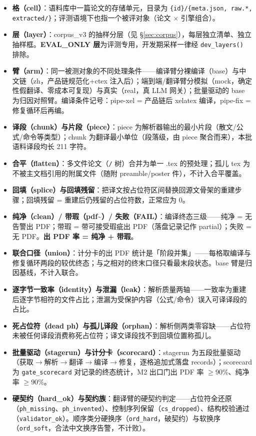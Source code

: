 \begin{itemize}
  \item \textbf{格（cell）}：语料库中一篇论文的存储单元，目录为 \texttt{\{id\}/\{meta.json, raw.*, extracted/\}}；评测语境下也指一个被评对象（论文 $\times$ 引擎组合）。
  \item \textbf{层（layer）}：corpus\_v3 的抽样分层（见 \S\ref{sec:corpus}），每层独立清单、独立抽样框。\textbf{EVAL\_ONLY 层}为评测专用，开发期采样一律经 \texttt{dev\_layers()} 排除。
  \item \textbf{臂（arm）}：同一被测对象的不同处理条件——编译臂分裸编译（base）与中文链（zh，产品链规范化+ctex 注入后）；端到端/翻译臂分模拟（mock，确定性假翻译、零成本可复现）与真实（real，真 LLM 网关）；批量驱动的 base 为归因对照臂。编译条件记号：pipe-xel = 产品链后 xelatex 编译，pipe-fix = 修复循环后再编。
  \item \textbf{译段（chunk）与片段（piece）}：piece 为解析器输出的最小片段（散文/公式/命令等类型）；chunk 为翻译最小单位（段落级，由 piece 聚合而来），本批语料译段均长 211 字符。
  \item \textbf{合平（flatten）}：多文件论文（\verb|/| 树）合并为单一 .tex 的预处理；孤儿 tex 为不被主文档引用的附属文件（随附 preamble/poster 件），不计入合平覆盖。
  \item \textbf{回填（splice）与回填残留}：把译文按占位符区间替换回源文骨架的重建步骤；回填残留 = 重建后仍残留的占位符数，正常应为 0。
  \item \textbf{纯净（clean）/ 带瑕（pdf\~{}）/ 失败（FAIL）}：编译终态三级——纯净 = 无告警出 PDF；带瑕 = 带可接受瑕疵出 PDF（落盘记录记作 partial）；失败 = 无 PDF。\textbf{出 PDF 率 = 纯净 + 带瑕}。
  \item \textbf{联合口径（union）}：计分卡的出 PDF 统计是「阶段并集」——每格取编译与修复循环两段的较优终态；与之相对的终末口径只看最末段状态。base 臂是归因基线，不计入联合。
  \item \textbf{逐字节一致率（identity）与泄漏（leak）}：解析质量两轴——一致率为重建后逐字节相符的文件占比；泄漏为受保护内容（公式/命令）误入可译译段的占比。
  \item \textbf{死占位符（dead ph）与孤儿译段（orphan）}：解析侧两类零容缺——占位符未被任何译段消费称死占位符；译文译段找不到回填位置称孤儿。
  \item \textbf{批量驱动（stagerun）与计分卡（scorecard）}：stagerun 为五段批量驱动（获取$\to$解析$\to$翻译$\to$编译$\to$修复，逐格追加式落盘 records）；scorecard 为 \texttt{gate\_scorecard} 对记录的终态统计，M2 出口门出 PDF 率 $\geq 90\%$、纯净率 $\geq 90\%$。
  \item \textbf{硬契约（hard\_ok）与契约族}：翻译臂的硬契约判定——占位符全还原（\texttt{ph\_missing}、\texttt{ph\_invented}）、控制序列保留（\texttt{cs\_dropped}）、结构校验通过（\texttt{validator\_ok}）。顺序类分硬换序（\texttt{ord\_hard}，破契约）与软换序（\texttt{ord\_soft}，合法中文换序告警，不计败）。

\end{itemize}
